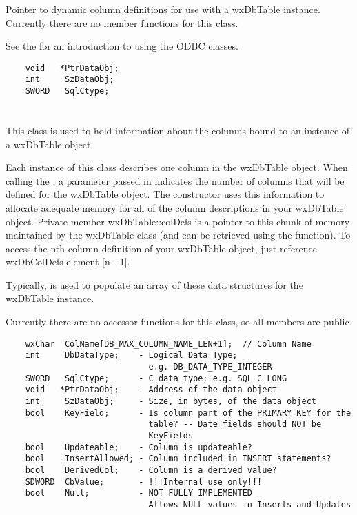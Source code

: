 Pointer to dynamic column definitions for use with a wxDbTable instance.
Currently there are no member functions for this class.

See the  for
an introduction to using the ODBC classes.

\begin{verbatim}
    void   *PtrDataObj;
    int     SzDataObj;
    SWORD   SqlCtype;
\end{verbatim}

\section{}\label{wxdbcoldef}

This class is used to hold information about the columns bound to an
instance of a wxDbTable object.

Each instance of this class describes one column in the wxDbTable
object.  When calling the , a
parameter passed in indicates the number of columns that will be defined for
the wxDbTable object.  The constructor uses this information to allocate
adequate memory for all of the column descriptions in your wxDbTable object.
Private member wxDbTable::colDefs is a pointer to this chunk of memory
maintained by the wxDbTable class (and can be retrieved using the
 function).
To access the nth column definition of your wxDbTable object, just reference
wxDbColDefs element [n - 1].

Typically,  is used to
populate an array of these data structures for the wxDbTable instance.

Currently there are no accessor functions for this class, so all members are
public.

\begin{verbatim}
    wxChar  ColName[DB_MAX_COLUMN_NAME_LEN+1];  // Column Name
    int     DbDataType;    - Logical Data Type;
                             e.g. DB_DATA_TYPE_INTEGER
    SWORD   SqlCtype;      - C data type; e.g. SQL_C_LONG
    void   *PtrDataObj;    - Address of the data object
    int     SzDataObj;     - Size, in bytes, of the data object
    bool    KeyField;      - Is column part of the PRIMARY KEY for the
                             table? -- Date fields should NOT be
                             KeyFields
    bool    Updateable;    - Column is updateable?
    bool    InsertAllowed; - Column included in INSERT statements?
    bool    DerivedCol;    - Column is a derived value?
    SDWORD  CbValue;       - !!!Internal use only!!!
    bool    Null;          - NOT FULLY IMPLEMENTED
                             Allows NULL values in Inserts and Updates
\end{verbatim}

